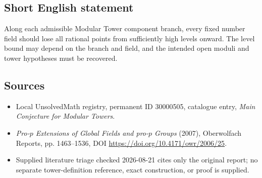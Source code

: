 \documentclass[11pt]{article}
\begin{document}
\subsection{Short English statement}
Along each admissible Modular Tower component branch, every fixed number field should lose all rational points from sufficiently high levels onward. The level bound may depend on the branch and field, and the intended open moduli and tower hypotheses must be recovered.
\subsection{Sources}
\begin{itemize}
\item Local UnsolvedMath registry, permanent ID 30000505, catalogue entry, \emph{Main Conjecture for Modular Towers}.
\item \emph{Pro-\(p\) Extensions of Global Fields and pro-\(p\) Groups} (2007), Oberwolfach Reports, pp. 1463--1536, DOI \url{https://doi.org/10.4171/owr/2006/25}.
\item Supplied literature triage checked 2026-08-21 cites only the original report; no separate tower-definition reference, exact construction, or proof is supplied.
\end{itemize}
\end{document}
